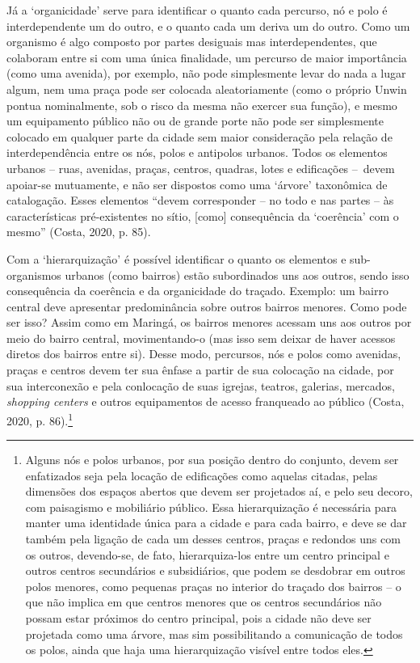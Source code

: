 \documentclass[12pt, a4paper]{book} %
\begin{document}
        Já a `organicidade' serve para identificar o quanto cada percurso, nó e polo é interdependente um do outro, e o quanto cada um deriva um do outro. Como um organismo é algo composto por partes desiguais mas interdependentes, que colaboram entre si com uma única finalidade, um percurso de maior importância (como uma avenida), por exemplo, não pode simplesmente levar do nada a lugar algum, nem uma praça pode ser colocada aleatoriamente (como o próprio Unwin pontua nominalmente, sob o risco da mesma não exercer sua função), e mesmo um equipamento público não ou de grande porte não pode ser simplesmente colocado em qualquer parte da cidade sem maior consideração pela relação de interdependência entre os nós, polos e antipolos urbanos. Todos os elementos urbanos – ruas, avenidas, praças, centros, quadras, lotes e edificações – devem apoiar-se mutuamente, e não ser dispostos como uma `árvore' taxonômica de catalogação. Esses elementos ``devem corresponder – no todo e nas partes – às características pré-existentes no sítio, [como] consequência da `coerência' com o mesmo'' (Costa, 2020, p. 85).

        Com a `hierarquização' é possível identificar o quanto os elementos e sub-organismos urbanos (como bairros) estão subordinados uns aos outros, sendo isso consequência da coerência e da organicidade do traçado. Exemplo: um bairro central deve apresentar predominância sobre outros bairros menores. Como pode ser isso? Assim como em Maringá, os bairros menores acessam uns aos outros por meio do bairro central, movimentando-o (mas isso sem deixar de haver acessos diretos dos bairros entre si). Desse modo, percursos, nós e polos como avenidas, praças e centros devem ter sua ênfase a partir de sua colocação na cidade, por sua interconexão e pela conlocação de suas igrejas, teatros, galerias, mercados, \textit{shopping centers} e outros equipamentos de acesso franqueado ao público (Costa, 2020, p. 86).\footnote[103]{Alguns nós e polos urbanos, por sua posição dentro do conjunto, devem ser enfatizados seja pela locação de edificações como aquelas citadas, pelas dimensões dos espaços abertos que devem ser projetados aí, e pelo seu decoro, com paisagismo e mobiliário público. Essa hierarquização é necessária para manter uma identidade única para a cidade e para cada bairro, e deve se dar também pela ligação de cada um desses centros, praças e redondos uns com os outros, devendo-se, de fato, hierarquiza-los entre um centro principal e outros centros secundários e subsidiários, que podem se desdobrar em outros polos menores, como pequenas praças no interior do traçado dos bairros – o que não implica em que centros menores que os centros secundários não possam estar próximos do centro principal, pois a cidade não deve ser projetada como uma árvore, mas sim possibilitando a comunicação de todos os polos, ainda que haja uma hierarquização visível entre todos eles.}
\end{document}
